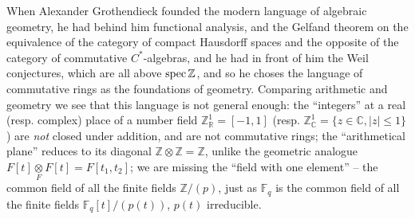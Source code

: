 \documentclass[leqno]{article}
\numberwithin{equation}{section}
\begin{document}
\smallskip

When Alexander Grothendieck founded the modern language of algebraic geometry, he had behind him functional analysis, and the Gelfand theorem on the equivalence of the category of compact Hausdorff spaces and the opposite of the category of commutative $C^*$-algebras, and he had in front of him the Weil conjectures, which are all above ${\rm spec} \, {\mathbb Z}$, and so he choses the language of commutative rings as the foundations of geometry. Comparing arithmetic and geometry we see that this language is not general enough: the ``integers'' at a real (resp. complex) place of a number field ${\mathbb Z}_{\mathbb R}^1 = [-1,1]$ (resp. ${\mathbb Z}_{\mathbb C}^1 = \{ z \in {\mathbb C} , \vert z \vert \leq 1 \}$) are {\it not} closed under addition, and are not commutative rings; the ``arithmetical plane'' reduces to its diagonal ${\mathbb Z} \otimes {\mathbb Z} = {\mathbb Z}$, unlike the geometric analogue $F[t] \underset{F}{\otimes} F[t] = F[t_1 , t_2]$; we are missing the ``field with one element'' -- the common field of all the finite fields ${\mathbb Z} / (p)$, just as ${\mathbb F}_q$ is the common field of all the finite fields ${\mathbb F}_q [t] / (p(t))$, $p(t)$ irreducible.

\smallskip
\end{document}
